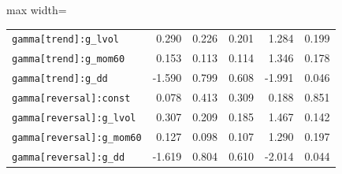\begin{table}[!htbp]
\begin{adjustbox}{max width=\textwidth}
\begin{tabular}{lrrrrr}
\texttt{gamma[trend]:g\_lvol} & 0.290 & 0.226 & 0.201 & 1.284 & 0.199\\
\texttt{gamma[trend]:g\_mom60} & 0.153 & 0.113 & 0.114 & 1.346 & 0.178\\
\texttt{gamma[trend]:g\_dd} & -1.590 & 0.799 & 0.608 & -1.991 & 0.046\\
\texttt{gamma[reversal]:const} & 0.078 & 0.413 & 0.309 & 0.188 & 0.851\\
\texttt{gamma[reversal]:g\_lvol} & 0.307 & 0.209 & 0.185 & 1.467 & 0.142\\
\texttt{gamma[reversal]:g\_mom60} & 0.127 & 0.098 & 0.107 & 1.290 & 0.197\\
\texttt{gamma[reversal]:g\_dd} & -1.619 & 0.804 & 0.610 & -2.014 & 0.044\\
\bottomrule
\end{tabular}
\end{adjustbox}
\end{table}